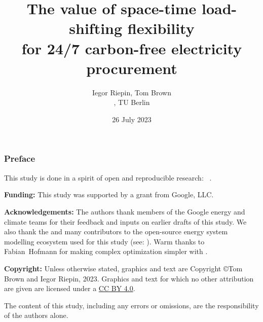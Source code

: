 


\title{The value of space-time load-shifting flexibility \\ 
for 24/7 carbon-free electricity procurement}

\author{
  Iegor Riepin, Tom Brown\\
  , TU Berlin
  }

\date{26 July 2023}




\maketitle

\begin{frame}
  \frametitle{Preface}

  \begin{itemize}
    {\small
    \item This study is done in a spirit of open and reproducible research: \faGithub~.
    \item {\bf Funding:} This study was supported by a grant from Google, LLC. 
    \item {\bf Acknowledgements:} The authors thank members of the Google energy and climate teams for their feedback and inputs on earlier drafts of this study. 
    We also thank the  and many contributors to the open-source energy system modelling ecosystem used for this study (see: ).
    Warm thanks to Fabian~Hofmann for making complex optimization simpler with . 
    \item {\bf Copyright:} Unless otherwise stated, graphics and text are Copyright \copyright Tom Brown and Iegor Riepin, 2023. Graphics and text for which no other attribution are given are licensed under a \href{https://creativecommons.org/licenses/by/4.0/}{CC BY 4.0}.  {\footnotesize \ccby} 
    \item The content of this study, including any errors or omissions, are the responsibility
    of the authors alone.
    }
  \end{itemize}

\end{frame}


